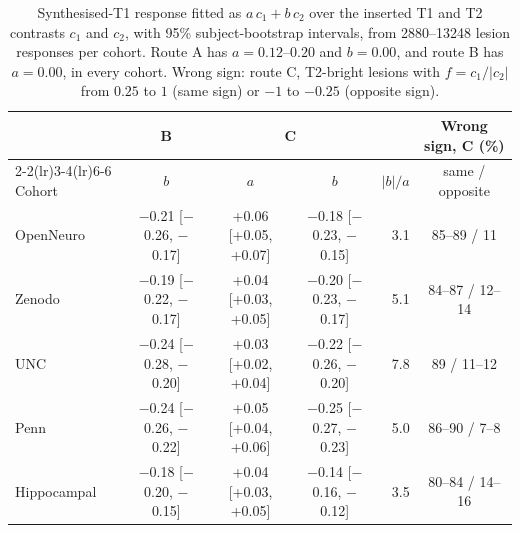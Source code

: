 \begin{table}[!htbp]
{\caption{Synthesised-T1 response fitted as $a\,c_1 + b\,c_2$ over the inserted T1 and T2 contrasts $c_1$ and $c_2$, with 95\% subject-bootstrap intervals, from 2880--13248 lesion responses per cohort. Route A has $a=0.12$--$0.20$ and $b=0.00$, and route B has $a=0.00$, in every cohort. Wrong sign: route C, T2-bright lesions with $f=c_1/|c_2|$ from $0.25$ to $1$ (same sign) or $-1$ to $-0.25$ (opposite sign).}}
{\scriptsize\setlength{\tabcolsep}{3pt}\begin{tabular*}{\linewidth}{@{\extracolsep{\fill}}lcccrc@{}}
\toprule
 & B & \multicolumn{2}{c}{C} & & \multicolumn{1}{c}{Wrong sign, C (\%)} \\
\cmidrule(lr){2-2}\cmidrule(lr){3-4}\cmidrule(lr){6-6}
Cohort & $b$ & $a$ & $b$ & $|b|/a$ & same / opposite \\
\midrule
OpenNeuro & $-$0.21 [$-$0.26, $-$0.17] & +0.06 [+0.05, +0.07] & $-$0.18 [$-$0.23, $-$0.15] & 3.1 & 85--89 / 11 \\
Zenodo & $-$0.19 [$-$0.22, $-$0.17] & +0.04 [+0.03, +0.05] & $-$0.20 [$-$0.23, $-$0.17] & 5.1 & 84--87 / 12--14 \\
UNC & $-$0.24 [$-$0.28, $-$0.20] & +0.03 [+0.02, +0.04] & $-$0.22 [$-$0.26, $-$0.20] & 7.8 & 89 / 11--12 \\
Penn & $-$0.24 [$-$0.26, $-$0.22] & +0.05 [+0.04, +0.06] & $-$0.25 [$-$0.27, $-$0.23] & 5.0 & 86--90 / 7--8 \\
Hippocampal & $-$0.18 [$-$0.20, $-$0.15] & +0.04 [+0.03, +0.05] & $-$0.14 [$-$0.16, $-$0.12] & 3.5 & 80--84 / 14--16 \\
\bottomrule
\end{tabular*}}
\end{table}
